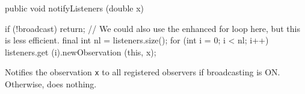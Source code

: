 \begin{code}

   public void notifyListeners (double x)\begin{hide} {
      if (!broadcast)
         return;
      // We could also use the enhanced for loop here, but this is less efficient.
      final int nl = listeners.size();
      for (int i = 0; i < nl; i++)
         listeners.get (i).newObservation (this, x);
   }\end{hide}
\end{code}
\begin{tabb}   Notifies the observation \texttt{x} to all registered observers
   if broadcasting is ON.  Otherwise, does nothing.
\end{tabb}
\begin{code}\begin{hide}

   public StatProbe clone() throws CloneNotSupportedException {
      StatProbe s = (StatProbe)super.clone();
      s.listeners = new ArrayList<ObservationListener>(listeners);
      return s;
   }
} 
\end{hide}
\end{code}
